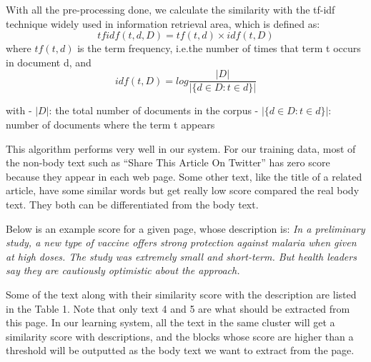 \documentclass{acm_proc_article-sp}
\begin{document}
With all the pre-processing done, we calculate the similarity with the tf-idf technique widely used in information retrieval area\cite{christopher:introduction}, which is defined as:
\begin{displaymath}
tfidf(t,d,D) = tf(t, d) \times idf(t, D)
\end{displaymath}
where $tf(t, d)$ is the term frequency, i.e.the number of times that term t occurs in document d, and
\begin{displaymath}
idf(t, D) = log\frac{|D|}{|\{d \in D : t \in d\}|}
\end{displaymath}

with \newline
- $|D|$: the total number of documents in the corpus \newline
- $|\{d \in D : t \in d\}|$: number of documents where the term t appears 

This algorithm performs very well in our system. For our training data, most of the non-body text such as ``Share This Article On Twitter'' has zero score because they appear in each web page. Some other text, like the title of a related article, have some similar words but get really low score compared the real body text. They both can be differentiated from the body text.

Below is an example score for a given page, whose description is: \textit{In a preliminary study, a new type of vaccine offers strong protection against malaria when given at high doses. The study was extremely small and short-term. But health leaders say they are cautiously optimistic about the approach.}

Some of the text along with their similarity score with the description are listed in the Table 1. Note that only text 4 and 5 are what should be extracted from this page. In our learning system, all the text in the same cluster will get a similarity score with descriptions, and the blocks whose score are higher than a threshold will be outputted as the body text we want to extract from the page.
\end{document}

